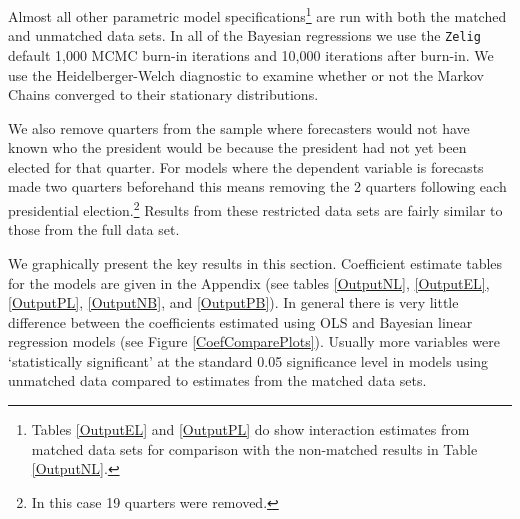 \documentclass[a4paper]{article}\usepackage{graphicx, color}
\begin{document}
Almost all other parametric model specifications\footnote{Tables \ref{OutputEL} and \ref{OutputPL} do show interaction estimates from matched data sets for comparison with the non-matched results in Table \ref{OutputNL}.} are run with both the matched and unmatched data sets. In all of the Bayesian regressions we use the {\tt{Zelig}} default 1,000 MCMC burn-in iterations and 10,000 iterations after burn-in. We use the Heidelberger-Welch diagnostic to examine whether or not the Markov Chains converged to their stationary distributions.

We also remove quarters from the sample where forecasters would not have known who the president would be because the president had not yet been elected for that quarter. For models where the dependent variable is forecasts made two quarters beforehand this means removing the 2 quarters following each presidential election.\footnote{In this case 19 quarters were removed.} Results from these restricted data sets are fairly similar to those from the full data set.

We graphically present the key results in this section. Coefficient estimate tables for the models are given in the Appendix (see tables \ref{OutputNL}, \ref{OutputEL}, \ref{OutputPL}, \ref{OutputNB}, and \ref{OutputPB}). In general there is very little difference between the coefficients estimated using OLS and Bayesian linear regression models (see Figure \ref{CoefComparePlots}). Usually more variables were `statistically significant' at the standard 0.05 significance level in models using unmatched data compared to estimates from the matched data sets.
\end{document}

